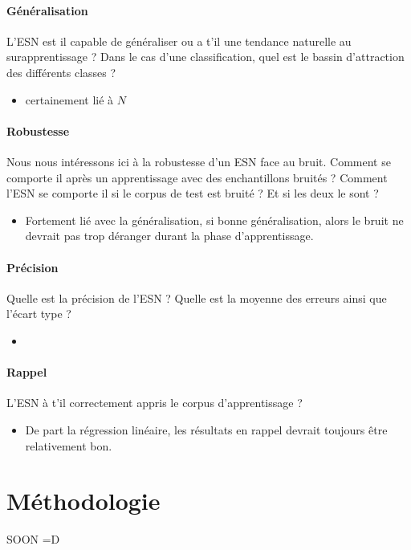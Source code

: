 \documentclass[12pt]{article}
\begin{document}
\paragraph{Généralisation}
L'ESN est il capable de généraliser ou a t'il une tendance naturelle au surapprentissage ? Dans le cas d'une classification, quel est le bassin d'attraction des différents classes ?

\begin{itemize}
\item certainement lié à $N$
\end{itemize}


\paragraph{Robustesse}
Nous nous intéressons ici à la robustesse d'un ESN face au bruit. Comment se comporte il après un apprentissage avec des enchantillons bruités ? Comment l'ESN se comporte il si le corpus de test est bruité ? Et si les deux le sont ?

\begin{itemize}
\item Fortement lié avec la généralisation, si bonne généralisation, alors le bruit ne devrait pas trop déranger durant la phase d'apprentissage.
\end{itemize}


\paragraph{Précision}
Quelle est la précision de l'ESN ? Quelle est la moyenne des erreurs ainsi que l'écart type ?

\begin{itemize}
\item
\end{itemize}

\paragraph{Rappel}
L'ESN à t'il correctement appris le corpus d'apprentissage ?

\begin{itemize}
\item De part la régression linéaire, les résultats en rappel devrait toujours être relativement bon.
\end{itemize}


\section{Méthodologie}

SOON =D
\end{document}
